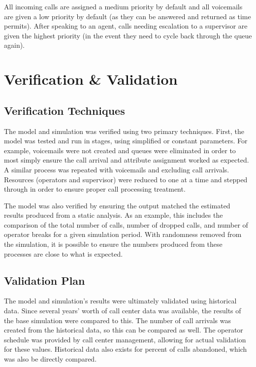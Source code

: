 \documentclass[12pt]{article}
\begin{document}
All incoming calls are assigned a medium priority by default and all voicemails are given a low priority by default (as they can be answered and returned as time permits).  After speaking to an agent, calls needing escalation to a supervisor are given the highest priority (in the event they need to cycle back through the queue again).


\section{Verification \& Validation}

	\subsection{Verification Techniques}

The model and simulation was verified using two primary techniques.  First, the model was tested and run in stages, using simplified or constant parameters.  For example, voicemails were not created and queues were eliminated in order to most simply ensure the call arrival and attribute assignment worked as expected.  A similar process was repeated with voicemails and excluding call arrivals.  Resources (operators and supervisor) were reduced to one at a time and stepped through in order to ensure proper call processing treatment.  

\par

The model was also verified by ensuring the output matched the estimated results produced from a static analysis.  As an example, this includes the comparison of the total number of calls, number of dropped calls, and number of operator breaks for a given simulation period.  With randomness removed from the simulation, it is possible to ensure the numbers produced from these processes are close to what is expected.
	
	
	\subsection{Validation Plan}
	
The model and simulation's results were ultimately validated using historical data.  Since several years' worth of call center data was available, the results of the base simulation were compared to this.  The number of call arrivals was created from the historical data, so this can be compared as well.  The operator schedule was provided by call center management, allowing for actual validation for these values.  Historical data also exists for percent of calls abandoned, which was also be directly compared.
	
\end{document}
